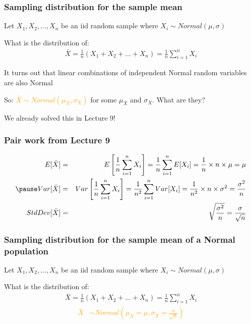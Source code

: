 \documentclass[t,compress,mathserif]{beamer}
\begin{document}
\begin{frame}
\frametitle{Sampling distribution for the sample mean}
Let $X_1, X_2, \ldots, X_n$ be an iid random sample where $X_i \sim Normal(\mu, \sigma)$

What is the distribution of: 
\begin{align}
    \bar{X}=\frac{1}{n}(X_1 + X_2 + \ldots + X_n)=\frac{1}{n}\sum_{i=1}^{n} X_i
\end{align}
\pause 

It turns out that linear combinations of independent Normal random variables are also Normal

So: \textcolor{orange}{
$\bar{X}\sim Normal\left(\mu_{\bar{X}}, \sigma_{\bar{X}}\right)$
}
for some $\mu_{\bar{X}}$ and $\sigma_{\bar{X}}$. What are they?

\pause
We already solved this in Lecture 9!

\end{frame}

\begin{frame}
\frametitle{Pair work from Lecture 9}

\begin{eqnarray*} 
E[\bar{X}] &=& E\left[\frac{1}{n}\sum_{i=1}^{n} X_i\right] = \frac{1}{n}\sum_{i=1}^{n} E[X_i] = \frac{1}{n}\times n \times \mu = \mu \\
\pause
Var[\bar{X}] &=& Var\left[\frac{1}{n}\sum_{i=1}^{n} X_i\right] = \frac{1}{n^2}\sum_{i=1}^{n} Var[X_i] = \frac{1}{n^2}\times n \times \sigma^2 = \frac{\sigma^2}{n} \\
StdDev[\bar{X}] &=& \sqrt{\frac{\sigma^2}{n}} = \frac{\sigma}{\sqrt{n}}
\end{eqnarray*} 

\end{frame}

\begin{frame}
\frametitle{Sampling distribution for the sample mean of a Normal population}
Let $X_1, X_2, \ldots, X_n$ be an iid random sample where $X_i \sim Normal(\mu, \sigma)$

What is the distribution of: 
\begin{align}
    \bar{X}=\frac{1}{n}(X_1 + X_2 + \ldots + X_n)=\frac{1}{n}\sum_{i=1}^{n} X_i
\end{align}
\textcolor{orange}{
\begin{align*}
 \bar{X} &\sim Normal\left(\mu_{\bar{X}}=\mu, \sigma_{\bar{X}}=\frac{\sigma}{\sqrt{n}}\right)
\end{align*}
}
\end{frame}
\end{document}

